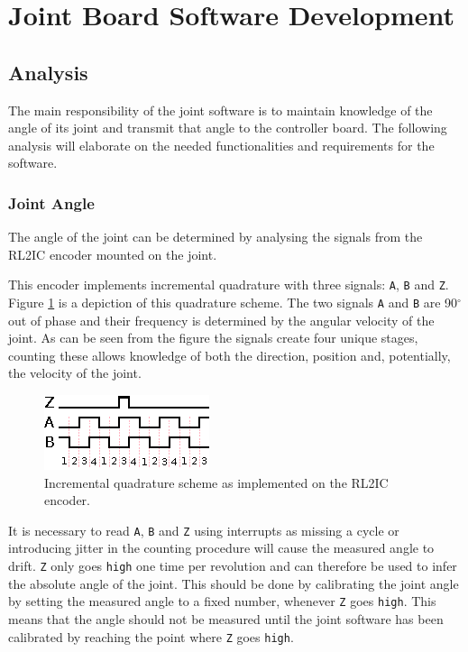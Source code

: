 \section{Joint Board Software Development} %
\label{sub:joint_board_software}

\subsection{Analysis} %
\label{ssub:joint_board_analysis}
The main responsibility of the joint software is to maintain knowledge of the angle of its joint and transmit that angle to the controller board.
The following analysis will elaborate on the needed functionalities and requirements for the software.

\subsubsection{Joint Angle}
The angle of the joint can be determined by analysing the signals from the RL2IC encoder mounted on the joint.

This encoder implements incremental quadrature with three signals: \texttt{A}, \texttt{B} and \texttt{Z}.
Figure \ref{fig:quadrature} is a depiction of this quadrature scheme.
The two signals \texttt{A} and \texttt{B} are 90$^\circ$ out of phase and their frequency is determined by the angular velocity of the joint.
As can be seen from the figure the signals create four unique stages, counting these allows knowledge of both the direction, position and, potentially, the velocity of the joint.

\begin{figure}[h]
	\centering
	\includegraphics[width=.5\linewidth]{graphics/quadrature}
	\caption[Incremental quadrature scheme RL2IC encoder.]{Incremental quadrature scheme as implemented on the RL2IC encoder.}
	\label{fig:quadrature}
\end{figure}

It is necessary to read \texttt{A}, \texttt{B} and \texttt{Z} using interrupts as missing a cycle or introducing jitter in the counting procedure will cause the measured angle to drift.
\texttt{Z} only goes \texttt{high} one time per revolution and can therefore be used to infer the absolute angle of the joint.
This should be done by calibrating the joint angle by setting  the measured angle to a fixed number, whenever \texttt{Z} goes \texttt{high}.
This means that the angle should not be measured until the joint software has been calibrated by reaching the point where \texttt{Z} goes \texttt{high}.

